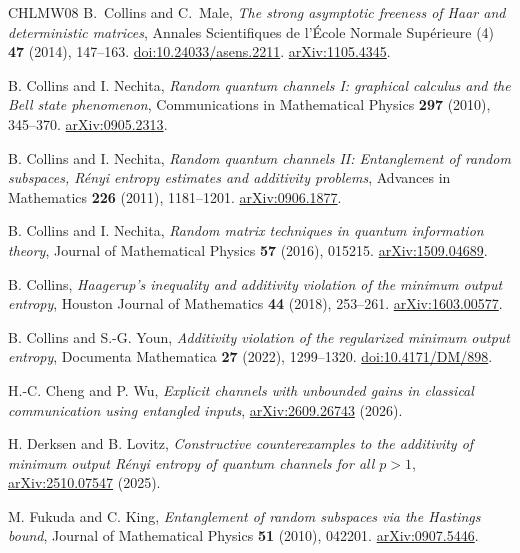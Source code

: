\documentclass[11pt]{article}
\numberwithin{equation}{section}
\theoremstyle{boldremark}\newtheorem{remark}[theorem]{Remark}
\begin{document}
\begin{thebibliography}{CHLMW08}
B.~Collins and C.~Male,
\emph{The strong asymptotic freeness of Haar and deterministic matrices},
Annales Scientifiques de l'\'Ecole Normale Sup\'erieure (4)
\textbf{47} (2014), 147--163.
\href{https://doi.org/10.24033/asens.2211}{doi:10.24033/asens.2211}.
\href{https://arxiv.org/abs/1105.4345}{arXiv:1105.4345}.

B. Collins and I. Nechita,
\emph{Random quantum channels I: graphical calculus and the Bell state phenomenon},
Communications in Mathematical Physics \textbf{297} (2010), 345--370.
\href{https://arxiv.org/abs/0905.2313}{arXiv:0905.2313}.

B. Collins and I. Nechita,
\emph{Random quantum channels II: Entanglement of random subspaces, R\'enyi entropy estimates and additivity problems},
Advances in Mathematics \textbf{226} (2011), 1181--1201.
\href{https://arxiv.org/abs/0906.1877}{arXiv:0906.1877}.

B. Collins and I. Nechita,
\emph{Random matrix techniques in quantum information theory},
Journal of Mathematical Physics \textbf{57} (2016), 015215.
\href{https://arxiv.org/abs/1509.04689}{arXiv:1509.04689}.

B. Collins,
\emph{Haagerup's inequality and additivity violation of the minimum output entropy},
Houston Journal of Mathematics \textbf{44} (2018), 253--261.
\href{https://arxiv.org/abs/1603.00577}{arXiv:1603.00577}.

B. Collins and S.-G. Youn,
\emph{Additivity violation of the regularized minimum output entropy},
Documenta Mathematica \textbf{27} (2022), 1299--1320.
\href{https://doi.org/10.4171/DM/898}{doi:10.4171/DM/898}.

H.-C. Cheng and P. Wu,
\emph{Explicit channels with unbounded gains in classical communication using entangled inputs},
\href{https://arxiv.org/abs/2609.26743}{arXiv:2609.26743} (2026).

H. Derksen and B. Lovitz,
\emph{Constructive counterexamples to the additivity of minimum output R\'enyi entropy of quantum channels for all $p>1$},
\href{https://arxiv.org/abs/2510.07547}{arXiv:2510.07547} (2025).

M. Fukuda and C. King,
\emph{Entanglement of random subspaces via the Hastings bound},
Journal of Mathematical Physics \textbf{51} (2010), 042201.
\href{https://arxiv.org/abs/0907.5446}{arXiv:0907.5446}.


\end{thebibliography}
\end{document}
